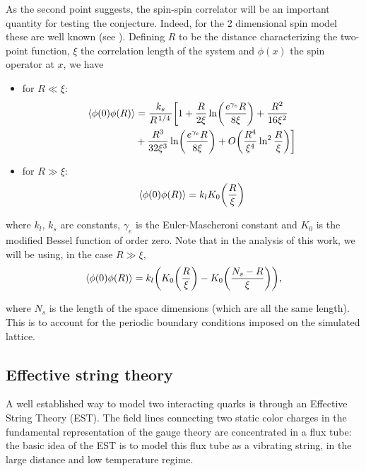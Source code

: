 \documentclass[reqno,12pt]{article}
\numberwithin{equation}{section}
\begin{document}
As the second point suggests, the spin-spin correlator will be an important quantity for testing the conjecture. Indeed, for the 2 dimensional
spin model these are well known (see \cite{caristo}). Defining $R$ to be the distance characterizing the two-point function, $\xi$ the
correlation length of the system and $\phi(x)$ the spin operator at $x$, we have
\begin{itemize}
	\item for $R \ll \xi$:
		\begin{equation} \label{eq:short_distance_spin}
			\begin{aligned}
				\expval{\phi(0) \phi(R)} &= \frac{k_s}{R^{\flatfrac{1}{4}}} \biggl[ 1 + \frac{R}{2\xi} \ln(\frac{e^{\gamma_e}R}{8\xi}) + \frac{R^2}{16\xi^2} \\
				&+ \frac{R^3}{32\xi^3} \ln(\frac{e^{\gamma_e}R}{8\xi}) + O\qty(\frac{R^4}{\xi^4}\ln^2\frac{R}{\xi}) \biggr]
			\end{aligned}
		\end{equation}

	\item for $R \gg \xi$:
		\begin{equation} 
			\expval{\phi(0) \phi(R)} = k_l K_0\qty(\frac{R}{\xi})
		\end{equation}
\end{itemize}

where $k_l$, $k_s$ are constants, $\gamma_e$ is the Euler-Mascheroni constant and $K_0$ is the modified Bessel function of order zero. 
Note that in the analysis of this work, we will be using, in the case $R \gg \xi$,
\begin{equation} \label{eq:large_distance_spin}
	\expval{\phi(0) \phi(R)} = k_l \qty(K_0\qty(\frac{R}{\xi}) - K_0\qty(\frac{N_s - R}{\xi})),
\end{equation}

where $N_s$ is the length of the space dimensions (which are all the same length). This is to account for the periodic boundary conditions
imposed on the simulated lattice.

\subsection{Effective string theory} \label{est}

A well established way to model two interacting quarks is through an Effective String Theory (EST). The field lines connecting
two static color charges in the fundamental representation of the gauge theory are concentrated in a flux tube: the basic
idea of the EST is to model this flux tube as a vibrating string, in the large distance and low temperature regime.
\end{document}
